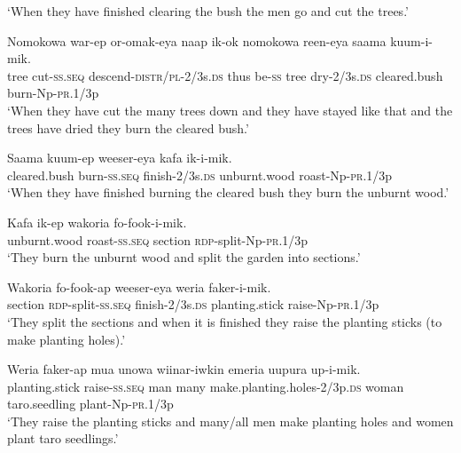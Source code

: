 \glt ‘When they have finished clearing the bush the men go and cut the trees.’ \\
\z


\ea\label{ex:a:x4}
\gll  Nomokowa  war-ep  or-omak-eya  naap  ik-ok  nomokowa     reen-eya  saama  kuum-i-mik. \\
tree  cut-\textsc{ss.seq}  descend-\textsc{distr}/\textsc{pl}-2/3s.\textsc{ds}  thus  be-\textsc{ss}  tree  dry-2/3s.\textsc{ds}  cleared.bush  burn-Np-\textsc{pr}.1/3p \\


\glt ‘When they have cut the many trees down and they have stayed like that and the trees have dried they burn the cleared bush.’ \\
\z


\ea\label{ex:a:x5}
\gll  Saama  kuum-ep  weeser-eya  kafa  ik-i-mik. \\
cleared.bush  burn-\textsc{ss.seq}  finish-2/3s.\textsc{ds}  unburnt.wood  roast-Np-\textsc{pr}.1/3p \\
\glt ‘When they have finished burning the cleared bush they burn the unburnt wood.’ \\
\z


\ea\label{ex:a:x6}
\gll  Kafa  ik-ep  wakoria  fo-fook-i-mik. \\
unburnt.wood  roast-\textsc{ss.seq}  section  \textsc{rdp}-split-Np-\textsc{pr}.1/3p \\
\glt ‘They burn the unburnt wood and split the garden into sections.’ \\
\z


\ea\label{ex:a:x7}
\gll  Wakoria  fo-fook-ap  weeser-eya  weria  faker-i-mik. \\
section  \textsc{rdp}-split-\textsc{ss.seq}  finish-2/3s.\textsc{ds}  planting.stick  raise-Np-\textsc{pr}.1/3p \\
\glt ‘They split the sections and when it is finished they raise the planting sticks (to make planting holes).’ \\
\z


\ea\label{ex:a:x8}
\gll  Weria  faker-ap  mua  unowa  wiinar-iwkin  emeria                     uupura  up-i-mik. \\
planting.stick  raise-\textsc{ss.seq}  man  many  make.planting.holes-2/3p.\textsc{ds}  woman taro.seedling  plant-Np-\textsc{pr}.1/3p \\


\glt ‘They raise the planting sticks and many/all men make planting holes and women plant taro seedlings.’ \\
\z


